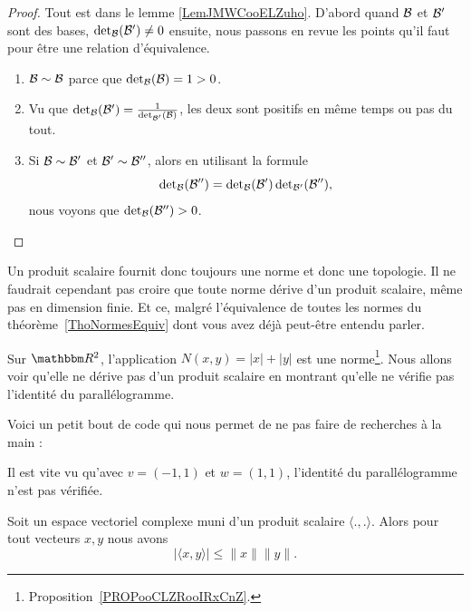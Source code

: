 \begin{proof}
    Tout est dans le lemme \ref{LemJMWCooELZuho}. D'abord quand \( \mathcal{B}\) et \( \mathcal{B}'\) sont des bases, \( \mathop{\mathrm{det}}\nolimits_{\mathcal{B}}(\mathcal{B}')\neq 0\) ensuite, nous passons en revue les points qu'il faut pour être une relation d'équivalence.
    \begin{enumerate}
        \item
            \( \mathcal{B}\sim \mathcal{B}\) parce que \( \mathop{\mathrm{det}}\nolimits_{\mathcal{B}}(\mathcal{B})=1>0\).
        \item
            Vu que \( \mathop{\mathrm{det}}\nolimits_{\mathcal{B}}(\mathcal{B}')=\frac{1}{ \mathop{\mathrm{det}}\nolimits_{\mathcal{B}'}(\mathcal{B}) }\), les deux sont positifs en même temps ou pas du tout.
        \item
            Si \( \mathcal{B}\sim \mathcal{B}'\) et \( \mathcal{B}'\sim\mathcal{B}''\), alors en utilisant la formule
            \begin{equation}
                \mathop{\mathrm{det}}\nolimits_{\mathcal{B}}(\mathcal{B}'')=\mathop{\mathrm{det}}\nolimits_{\mathcal{B}}(\mathcal{B}')\mathop{\mathrm{det}}\nolimits_{\mathcal{B}'}(\mathcal{B}''),
            \end{equation}
            nous voyons que \( \mathop{\mathrm{det}}\nolimits_{\mathcal{B}}(\mathcal{B}'')>0\).
    \end{enumerate}
\end{proof}


\begin{normaltext}
    Un produit scalaire fournit donc toujours une norme et donc une topologie. Il ne faudrait cependant pas croire que toute norme dérive d'un produit scalaire, même pas en dimension finie. Et ce, malgré l'équivalence de toutes les normes du théorème~\ref{ThoNormesEquiv} dont vous avez déjà peut-être entendu parler.
\end{normaltext}

\begin{example}     \label{EXooCAPYooMgOSyH}
    Sur \( \eR^2\), l'application \( N(x,y)=| x |+| y |\) est une norme\footnote{Proposition~\ref{PROPooCLZRooIRxCnZ}.}. Nous allons voir qu'elle ne dérive pas d'un produit scalaire en montrant qu'elle ne vérifie pas l'identité du parallélogramme.

    Voici un petit bout de code qui nous permet de ne pas faire de recherches à la main :
    

    Il est vite vu qu'avec \( v=(-1,1)\) et \( w=(1,1)\), l'identité du parallélogramme n'est pas vérifiée.
\end{example}

\begin{theorem}
     Soit un espace vectoriel complexe muni d'un produit scalaire \( \langle ., .\rangle \). Alors pour tout vecteurs \( x,y\) nous avons
     \begin{equation}
         | \langle x, y\rangle  |\leq \| x \|\| y \|.
     \end{equation}
\end{theorem}


